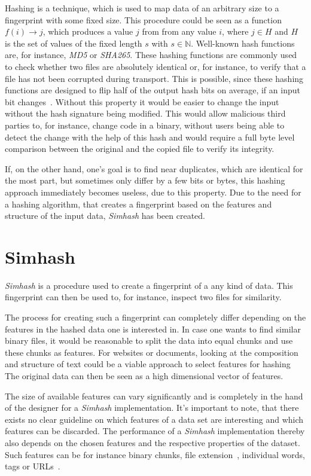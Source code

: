 \documentclass[12pt,a4paper,DIV=calc]{scrartcl}
\begin{document}
Hashing is a technique, which is used to map data of an arbitrary size to a fingerprint with some fixed size.
This procedure could be seen as a function  $f(i) \rightarrow j$, which produces a value $j$ from from any value $i$, where $j \in H$ and $H$ is the set of values of the fixed length $s$ with $s \in \mathbb{N}$.
Well-known hash functions are, for instance, \emph{MD5} or \emph{SHA265}.
These hashing functions are commonly used to check whether two files are absolutely identical or, for instance, to verify that a file has not been corrupted during transport.
This is possible, since these hashing functions are designed to flip half of the output hash bits on average, if an input bit changes~\cite{book:hashing}.
Without this property it would be easier to change the input without the hash signature being modified.
This would allow malicious third parties to, for instance, change code in a binary, without users being able to detect the change with the help of this hash and would require a full byte level comparison between the original and the copied file to verify its integrity.

If, on the other hand, one's goal is to find near duplicates, which are identical for the most part, but sometimes only differ by a few bits or bytes, this hashing approach immediately becomes useless, due to this property.
Due to the need for a hashing algorithm, that creates a fingerprint based on the features and structure of the input data, \emph{Simhash} has been created.


\section{Simhash}

\emph{Simhash} is a procedure used to create a fingerprint of a any kind of data.
This fingerprint can then be used to, for instance, inspect two files for similarity.

The process for creating such a fingerprint can completely differ depending on the features in the hashed data one is interested in.
In case one wants to find similar binary files, it would be reasonable to split the data into equal chunks and use these chunks as features.
For websites or documents, looking at the composition and structure of text could be a viable approach to select features for hashing
The original data can then be seen as a high dimensional vector of features.

The size of available features can vary significantly and is completely in the hand of the designer for a \emph{Simhash} implementation.
It's important to note, that there exists no clear guideline on which features of a data set are interesting and which features can be discarded.
The performance of a \emph{Simhash} implementation thereby also depends on the chosen features and the respective properties of the dataset.
Such features can be for instance binary chunks, file extension~\cite{inproc:simhash}, individual words, tags or URLs~\cite{inproc:main}.
\end{document}
